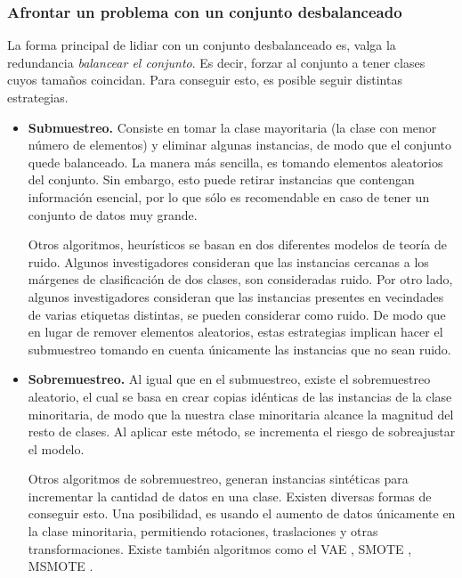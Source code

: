     \subsubsection{Afrontar un problema con un conjunto desbalanceado}
    La forma principal de lidiar con un conjunto desbalanceado es, valga la redundancia \textsl{balancear el conjunto}. Es decir, forzar al conjunto a tener clases cuyos tamaños coincidan. Para conseguir esto, es posible seguir distintas estrategias.
    \begin{itemize}
        \item \textbf{Submuestreo.} Consiste en tomar la clase mayoritaria (la clase con menor número de elementos) y eliminar algunas instancias, de modo que el conjunto quede balanceado. La manera más sencilla, es tomando elementos aleatorios del conjunto. Sin embargo, esto puede retirar instancias que contengan información esencial, por lo que sólo es recomendable en caso de tener un conjunto de datos muy grande.

        Otros algoritmos, heurísticos se basan en dos diferentes modelos de teoría de ruido. Algunos investigadores consideran que las instancias cercanas a los márgenes de clasificación de dos clases, son consideradas ruido. Por otro lado, algunos investigadores consideran que las instancias presentes en vecindades de varias etiquetas distintas, se pueden considerar como ruido. De modo que en lugar de remover elementos aleatorios, estas estrategias implican hacer el submuestreo tomando en cuenta únicamente las instancias que no sean ruido.

        \item \textbf{Sobremuestreo.} Al igual que en el submuestreo, existe el sobremuestreo aleatorio, el cual se basa en crear copias idénticas de las instancias de la clase minoritaria, de modo que la nuestra clase minoritaria alcance la magnitud del resto de clases. Al aplicar este método, se incrementa el riesgo de sobreajustar el modelo. 

        Otros algoritmos de sobremuestreo, generan instancias sintéticas para incrementar la cantidad de datos en una clase. Existen diversas formas de conseguir esto. Una posibilidad, es usando el aumento de datos únicamente en la clase minoritaria, permitiendo rotaciones, traslaciones y otras transformaciones. Existe también algoritmos como el VAE \cite{VAE}, SMOTE \cite{SMOTE}, MSMOTE \cite{MSMOTE}. 

    \end{itemize}

